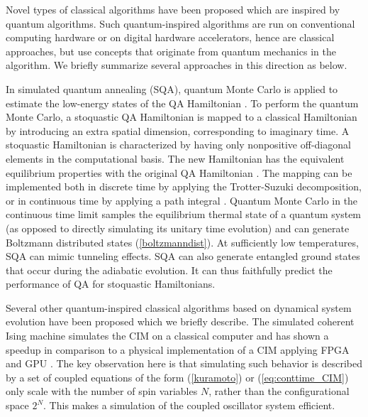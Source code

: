 \documentclass[fleqn,10pt]{wlscirep}
\def\change#1{#1}
\begin{document}
Novel types of classical algorithms have been proposed which are inspired by quantum algorithms.  Such quantum-inspired algorithms are run on conventional computing hardware or on \change{digital} hardware accelerators, hence are classical approaches, but use concepts that originate from quantum mechanics in the algorithm. We briefly summarize several approaches in this direction as below.  

In simulated quantum annealing (SQA), quantum Monte Carlo is applied to estimate the low-energy states of the QA Hamiltonian \cite{bapst2013thermal,das2005quantum,crosson2016simulated}.   To perform the quantum Monte Carlo, a stoquastic QA Hamiltonian is mapped to a classical Hamiltonian by introducing an extra spatial dimension, corresponding to imaginary time. A stoquastic Hamiltonian is characterized by
having only nonpositive off-diagonal elements in the computational basis. The new Hamiltonian has the equivalent equilibrium properties with the original QA Hamiltonian \cite{andriyash2017can}.  The mapping can be implemented both in discrete time by applying the  Trotter-Suzuki decomposition, or in continuous time by applying a path integral \cite{andriyash2017can}. 
Quantum Monte Carlo in the continuous time limit samples the equilibrium thermal state of a quantum system (as opposed to directly simulating its unitary time evolution) and can generate Boltzmann distributed states (\ref{boltzmanndist}).  At sufficiently low temperatures, SQA can mimic tunneling effects. SQA can also generate entangled ground states that occur during the adiabatic evolution. It can thus faithfully predict the  performance of QA for stoquastic Hamiltonians.  






Several other quantum-inspired classical algorithms  based on dynamical system evolution have been proposed which we briefly describe.  The simulated coherent Ising machine simulates the CIM on a classical computer and has shown a speedup in comparison to a physical implementation of a CIM applying FPGA \cite{king2018emulating} and GPU \cite{tiunov2019annealing}.   The key observation here is that simulating such behavior is described by a set of coupled equations of the form (\ref{kuramoto}) or (\ref{eq:conttime_CIM}) only scale with the number of spin variables $ N $, rather than the configurational space $ 2^N$.  This makes a simulation of the coupled oscillator system efficient. 
\end{document}
